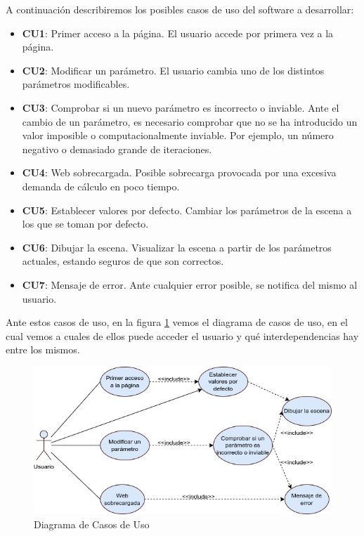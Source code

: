 A continuación describiremos los posibles casos de uso del software a desarrollar:
\begin{itemize}
    \item \textbf{CU1}: Primer acceso a la página. El usuario accede por primera vez a la página.
    \item \textbf{CU2}: Modificar un parámetro. El usuario cambia uno de los distintos parámetros modificables.
    \item \textbf{CU3}: Comprobar si un nuevo parámetro es incorrecto o inviable. Ante el cambio de un parámetro, es necesario comprobar que no se ha introducido un valor imposible o computacionalmente inviable. Por ejemplo, un número negativo o demasiado grande de iteraciones.
    \item \textbf{CU4}: Web sobrecargada. Posible sobrecarga provocada por una excesiva demanda de cálculo en poco tiempo.
    \item \textbf{CU5}: Establecer valores por defecto. Cambiar los parámetros de la escena a los que se toman por defecto.
    \item \textbf{CU6}: Dibujar la escena. Visualizar la escena a partir de los parámetros actuales, estando seguros de que son correctos.
    \item \textbf{CU7}: Mensaje de error. Ante cualquier error posible, se notifica del mismo al usuario.
\end{itemize}

Ante estos casos de uso, en la figura \ref{fig:casos-uso} vemos el diagrama de casos de uso, en el cual vemos a cuales de ellos puede acceder el usuario y qué interdependencias hay entre los mismos.

\begin{figure} [ht]
\centering
\includegraphics[scale = 0.6]{img/diagrama-CU.png}
\caption{Diagrama de Casos de Uso}
    \label{fig:casos-uso}
\end{figure}
\newpage
